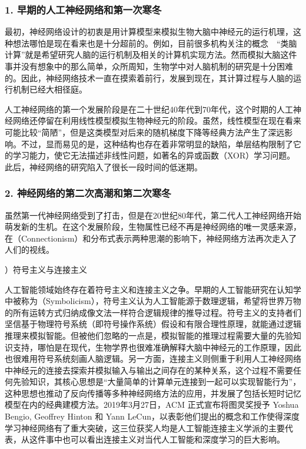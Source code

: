 \subsubsection{1. 早期的人工神经网络和第一次寒冬}

\parinterval 最初，神经网络设计的初衷是用计算模型来模拟生物大脑中神经元的运行机理，这种想法哪怕是现在看来也是十分超前的。例如，目前很多机构关注的概念\ \dash \ “类脑计算”就是希望研究人脑的运行机制及相关的计算机实现方法。然而模拟大脑这件事并没有想象中的那么简单，众所周知，生物学中对人脑机制的研究是十分困难的。因此，神经网络技术一直在摸索着前行，发展到现在，其计算过程与人脑的运行机制已经大相径庭。

\parinterval 人工神经网络的第一个发展阶段是在二十世纪40年代到70年代，这个时期的人工神经网络还停留在利用线性模型模拟生物神经元的阶段。虽然，线性模型在现在看来可能比较“简陋”，但是这类模型对后来的随机梯度下降等经典方法产生了深远影响。不过，显而易见的是，这种结构也存在着非常明显的缺陷，单层结构限制了它的学习能力，使它无法描述非线性问题，如著名的异或函数（XOR）学习问题。此后，神经网络的研究陷入了很长一段时间的低迷期。


\subsubsection{2. 神经网络的第二次高潮和第二次寒冬}

\parinterval 虽然第一代神经网络受到了打击，但是在20世纪80年代，第二代人工神经网络开始萌发新的生机。在这个发展阶段，生物属性已经不再是神经网络的唯一灵感来源，在{\small{}}（Connectionism）和分布式表示两种思潮的影响下，神经网络方法再次走入了人们的视线。

\vspace{0.3em}
）符号主义与连接主义
\vspace{0.3em}

\parinterval 人工智能领域始终存在着符号主义和连接主义之争。早期的人工智能研究在认知学中被称为{\small{}}（Symbolicism），符号主义认为人工智能源于数理逻辑，希望将世界万物的所有运转方式归纳成像文法一样符合逻辑规律的推导过程。符号主义的支持者们坚信基于物理符号系统（即符号操作系统）假设和有限合理性原理，就能通过逻辑推理来模拟智能。但被他们忽略的一点是，模拟智能的推理过程需要大量的先验知识支持，哪怕是在现代，生物学界也很难准确解释大脑中神经元的工作原理，因此也很难用符号系统刻画人脑逻辑。另一方面，连接主义则侧重于利用人工神经网络中神经元的连接去探索并模拟输入与输出之间存在的某种关系，这个过程不需要任何先验知识，其核心思想是“大量简单的计算单元连接到一起可以实现智能行为”，这种思想也推动了反向传播等多种神经网络方法的应用，并发展了包括长短时记忆模型在内的经典建模方法。2019年3月27日，ACM 正式宣布将图灵奖授予 Yoshua Bengio, Geoffrey Hinton 和 Yann LeCun，以表彰他们提出的概念和工作使得深度学习神经网络有了重大突破，这三位获奖人均是人工智能连接主义学派的主要代表，从这件事中也可以看出连接主义对当代人工智能和深度学习的巨大影响。

